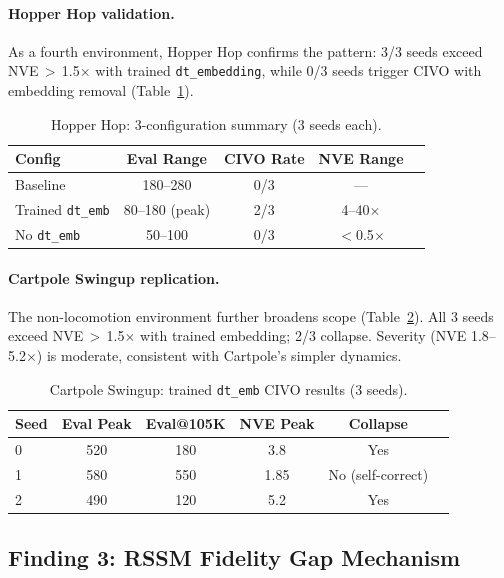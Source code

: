 \documentclass{article}
\begin{document}
\paragraph{Hopper Hop validation.}
As a fourth environment, Hopper Hop confirms the pattern: 3/3 seeds exceed NVE\,$>$\,1.5$\times$ with trained \texttt{dt\_embedding}, while 0/3 seeds trigger CIVO with embedding removal (Table~\ref{tab:hopper}).

\begin{table}[h]
\centering
\caption{Hopper Hop: 3-configuration summary (3 seeds each).}
\label{tab:hopper}
\begin{tabular}{lcccc}
\toprule
\textbf{Config} & \textbf{Eval Range} & \textbf{CIVO Rate} & \textbf{NVE Range} \\
\midrule
Baseline & 180--280 & 0/3 & --- \\
Trained \texttt{dt\_emb} & 80--180 (peak) & 2/3 & 4--40$\times$ \\
No \texttt{dt\_emb} & 50--100 & 0/3 & $<$0.5$\times$ \\
\bottomrule
\end{tabular}
\end{table}

\paragraph{Cartpole Swingup replication.}
The non-locomotion environment further broadens scope (Table~\ref{tab:cartpole-civo}).
All 3 seeds exceed NVE\,$>$\,1.5$\times$ with trained embedding; 2/3 collapse.
Severity (NVE 1.8--5.2$\times$) is moderate, consistent with Cartpole's simpler dynamics.

\begin{table}[h]
\centering
\caption{Cartpole Swingup: trained \texttt{dt\_emb} CIVO results (3 seeds).}
\label{tab:cartpole-civo}
\begin{tabular}{lccccc}
\toprule
\textbf{Seed} & \textbf{Eval Peak} & \textbf{Eval@105K} & \textbf{NVE Peak} & \textbf{Collapse} \\
\midrule
0 & 520 & 180 & 3.8 & Yes \\
1 & 580 & 550 & 1.85 & No (self-correct) \\
2 & 490 & 120 & 5.2 & Yes \\
\bottomrule
\end{tabular}
\end{table}


\subsection{Finding 3: RSSM Fidelity Gap Mechanism}
\label{sec:fidelity}
\end{document}
